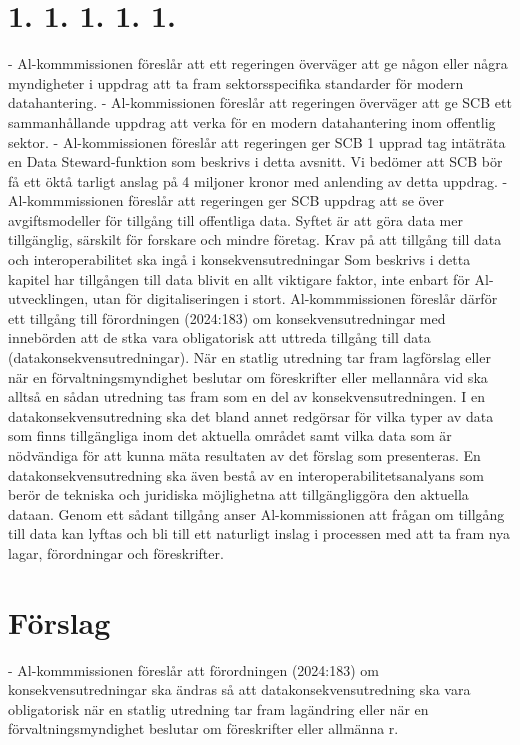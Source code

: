 {{{{{{{\section*{1. 1. 1. 1. 1.}
- Al-kommmissionen föreslår att ett regeringen överväger att ge någon eller några myndigheter i uppdrag att ta fram sektorsspecifika standarder för modern datahantering.
- Al-kommissionen föreslår att regeringen överväger att ge SCB ett sammanhållande uppdrag att verka för en modern datahantering inom offentlig sektor.
- Al-kommissionen föreslår att regeringen ger SCB 1 upprad tag intäträta en Data Steward-funktion som beskrivs i detta avsnitt. Vi bedömer att SCB bör få ett öktå tarligt anslag på 4 miljoner kronor med anlending av detta uppdrag.
- Al-kommmissionen föreslår att regeringen ger SCB uppdrag att se över avgiftsmodeller för tillgång till offentliga data. Syftet är att göra data mer tillgänglig, särskilt för forskare och mindre företag.
Krav på att tillgång till data och interoperabilitet ska ingå i konsekvensutredningar
Som beskrivs i detta kapitel har tillgången till data blivit en allt viktigare faktor, inte enbart för Al-utvecklingen, utan för digitaliseringen i stort. Al-kommmissionen föreslår därför ett tillgång till förordningen (2024:183) om konsekvensutredningar med innebörden att de stka vara obligatorisk att uttreda tillgång till data (datakonsekvensutredningar). När en statlig utredning tar fram lagförslag eller när en förvaltningsmyndighet beslutar om föreskrifter eller mellannåra vid ska alltså en sådan utredning tas fram som en del av konsekvensutredningen.
I en datakonsekvensutredning ska det bland annet redgörsar för vilka typer av data som finns tillgängliga inom det aktuella området samt vilka data som är nödvändiga för att kunna mäta resultaten av det förslag som presenteras. En datakonsekvensutredning ska även bestå av en interoperabilitetsanalyans som berör de tekniska och juridiska möjlighetna att tillgängliggöra den aktuella dataan. Genom ett sådant tillgång anser Al-kommissionen att frågan om tillgång till data kan lyftas och bli till ett naturligt inslag i processen med att ta fram nya lagar, förordningar och föreskrifter.
\section*{Förslag}
- Al-kommmissionen föreslår att förordningen (2024:183) om konsekvensutredningar ska ändras så att datakonsekvensutredning ska vara obligatorisk när en statlig utredning tar fram lagändring eller när en förvaltningsmyndighet beslutar om föreskrifter eller allmänna r.

}}}}}}}
